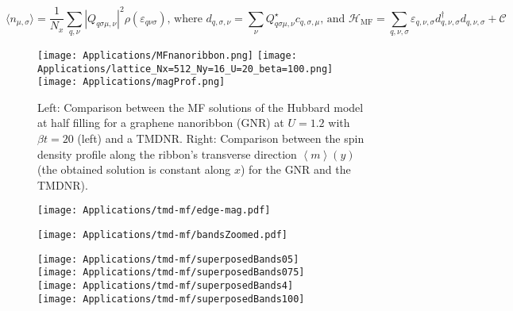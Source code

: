 \begin{equation}
\big\langle n_{\mu, \sigma} \big\rangle = \frac{1}{N_x}\sum_{q, \nu} | Q_{q \sigma \mu, \nu} |^2 \rho ( \varepsilon_{q \nu \sigma} ) , \, \text{where} \,\, d_{q, \sigma, \nu} = \sum_\nu Q_{q \sigma \mu, \nu}^\star c_{q ,\sigma, \mu} ,  \, \text{and} \,\, \mathcal{H}_{\text{MF}} = \sum_{q, \nu, \sigma} \varepsilon_{q, \nu, \sigma} d_{q, \nu, \sigma}^\dagger d_{q, \nu, \sigma} + \mathcal{C}
\end{equation}
\begin{figure}[H]
\hspace{0.1cm}
\texttt{[image: Applications/MFnanoribbon.png]}
\hspace{0.05cm}
\texttt{[image: Applications/lattice\_Nx=512\_Ny=16\_U=20\_beta=100.png]}
\hspace{1cm}
\texttt{[image: Applications/magProf.png]}
	\caption[Comparison between the MF solutions of the Hubbard model for a graphene nanoribbon (GNR) and a \acs{TMDNR}. Spin density profile along the ribbon's transverse direction.]{Left: Comparison between the MF solutions of the Hubbard model at half filling for a graphene nanoribbon (GNR) at $U=1.2$ with $\beta t = 20$ (left) and a \acs{TMDNR}.
	Right: Comparison between the spin density profile along the ribbon's transverse direction $\left\langle m \right\rangle (y)$ (the obtained solution is constant along $x$) for the GNR and the \acs{TMDNR}).}
	\label{fig:nanoGraphVsTMD}
\end{figure}
\begin{figure}[H]
\centering
\texttt{[image: Applications/tmd-mf/edge-mag.pdf]}
	\caption[]{}
	\label{fig:zeroTphaseDiagram}
\end{figure}
\begin{figure}[H]
\centering
\texttt{[image: Applications/tmd-mf/bandsZoomed.pdf]}
	\caption[]{}
	\label{fig:bandsZoomed}
\end{figure}
\begin{figure}[H]
\centering
\texttt{[image: Applications/tmd-mf/superposedBands05]} \\
\texttt{[image: Applications/tmd-mf/superposedBands075]} \\
\texttt{[image: Applications/tmd-mf/superposedBands4]} \\
\texttt{[image: Applications/tmd-mf/superposedBands100]} \\
	\caption[]{}
	\label{fig:band-structures}
\end{figure}
